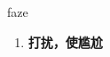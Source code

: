 
\begin{frame}
{\huge faze}
\begin{center}
\begin{enumerate}\Large
  \item \textbf{打扰，使尴尬}
\end{enumerate}
\end{center}
\end{frame}
